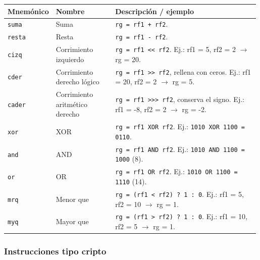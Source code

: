 \begin{longtable}[]{@{}p{0.15\linewidth}p{0.240\linewidth}p{0.6\linewidth}@{}}
\toprule\noalign{}
Mnemónico & Nombre & Descripción / ejemplo \\
\midrule\noalign{}
\endhead
\bottomrule\noalign{}
\endlastfoot
\texttt{suma} & Suma &
\texttt{rg = rf1 + rf2}. \\
\texttt{resta} & Resta &
\texttt{rg = rf1 - rf2}. \\
\texttt{cizq} & Corrimiento izquierdo &
\texttt{rg = rf1 \textless{}\textless{} rf2}. Ej.: rf1 = 5, rf2 = 2 $\rightarrow$ rg =
20. \\
\texttt{cder} & Corrimiento derecho lógico &
\texttt{rg = rf1 \textgreater{}\textgreater{} rf2}, rellena con ceros. Ej.: rf1 =
20, rf2 = 2 $\rightarrow$ rg = 5. \\
\texttt{cader} & Corrimiento aritmético derecho &
\texttt{rg = rf1 \textgreater{}\textgreater{}\textgreater{} rf2}, conserva el signo. Ej.: rf1
= -8, rf2 = 2 $\rightarrow$ rg = -2. \\
\texttt{xor} & XOR &
\texttt{rg = rf1 XOR rf2}. Ej.:
\texttt{1010 XOR 1100 = 0110}. \\
\texttt{and} & AND &
\texttt{rg = rf1 AND rf2}. Ej.:
\texttt{1010 AND 1100 = 1000} (8). \\
\texttt{or} & OR &
\texttt{rg = rf1 OR rf2}. Ej.:
\texttt{1010 OR 1100 = 1110} (14). \\
\texttt{mrq} & Menor que &
\texttt{rg = (rf1 \textless{} rf2) ? 1 : 0}. Ej.: rf1 = 5, rf2 =
10 $\rightarrow$ rg = 1. \\
\texttt{myq} & Mayor que &
\texttt{rg = (rf1 \textgreater{} rf2) ? 1 : 0}. Ej.: rf1 = 10, rf2 =
5 $\rightarrow$ rg = 1. \\
\end{longtable}
\subsubsection{Instrucciones tipo cripto}\label{instrucciones-tipo-cripto}

